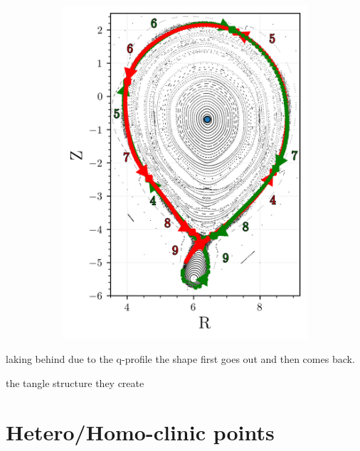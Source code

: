 \begin{figure}[H]
\begin{minipage}{0.45\textwidth}
\begin{subfigure}[b]{0.99\textwidth}
            \caption{}
            \label{fig:}
        \end{subfigure}
    \end{minipage}%
    \begin{minipage}{0.5\textwidth} %
        \centering
        \begin{subfigure}[b]{\textwidth}
            \centering
            \includegraphics[width=\textwidth]{images/manifold/manifold.png}
            \caption{}
            \label{fig:}
        \end{subfigure}
    \end{minipage}
    \caption{}
    \label{fig:}
\end{figure}

laking behind due to the q-profile
the shape first goes out and then comes back.

the tangle structure they create

\section{Hetero/Homo-clinic points}

